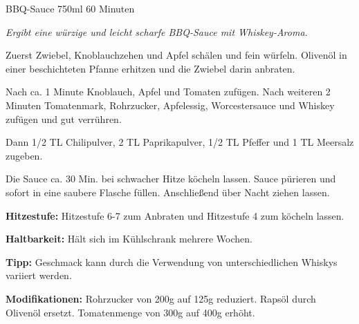\begin{recipe}{BBQ-Sauce} {750ml} {60 Minuten}

\freeform
\textit{Ergibt eine würzige und leicht scharfe BBQ-Sauce mit Whiskey-Aroma.}


Zuerst Zwiebel, Knoblauchzehen und Apfel schälen und fein würfeln.
Olivenöl in einer beschichteten Pfanne erhitzen und die Zwiebel darin anbraten.


Nach ca. 1 Minute Knoblauch, Apfel und Tomaten zufügen.
Nach weiteren 2 Minuten Tomatenmark, Rohrzucker, Apfelessig, Worcestersauce und Whiskey zufügen und gut verrühren.


Dann 1/2 TL Chilipulver, 2 TL Paprikapulver, 1/2 TL Pfeffer und 1 TL Meersalz zugeben.

\newstep
Die Sauce ca. 30 Min. bei schwacher Hitze köcheln lassen.
Sauce pürieren und sofort in eine saubere Flasche füllen.
Anschließend über Nacht ziehen lassen.

\freeform
\hrulefill

\freeform
\textbf{Hitzestufe:}
Hitzestufe 6-7 zum Anbraten und Hitzestufe 4 zum köcheln lassen.

\freeform 
\textbf{Haltbarkeit:}
Hält sich im Kühlschrank mehrere Wochen.

\freeform 
\textbf{Tipp:}
Geschmack kann durch die Verwendung von unterschiedlichen Whiskys variiert werden.

\freeform 
\textbf{Modifikationen:}
Rohrzucker von 200g auf 125g reduziert. Rapsöl durch Olivenöl ersetzt. Tomatenmenge von 300g auf 400g erhöht.

\end{recipe}
